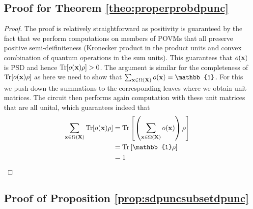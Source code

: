 \subsection{Proof for Theorem \ref{theo:properprobdpunc}}
\label{sec:proof:theo:properpropdpunc}

\theoproperprobdpunc*

\begin{proof}
	The proof is relatively straightforward as positivity is guaranteed by the fact that we perform computations on members of POVMs that all preserve positive semi-deifiniteness (Kronecker product in the product units and convex combination of quantum operations in the sum units). This guarantees that $o(\mathbf{x})$ is PSD and hence $ \Tr [o(\mathbf{x}) \rho]>0$. The argument is similar for the completeness of $\Tr [o(\mathbf{x}) \rho]$ as here we need to show that $\sum_{\xvars \in \Omega(\Xvars)} \ocircuit(\xvars) =\mathbb{1}$. For this we push down the summations to the corresponding leaves where we obtain unit matrices. The circuit then performs again computation with these unit matrices that are all unital, which guarantees indeed that
	\begin{align}
		\sum_{\xvars \in \Omega(\Xvars)} \Tr [\ocircuit(\xvars) \rho]
		 & =
		\Tr \left[
			\left(
			\sum_{\xvars \in \Omega(\Xvars)}\ocircuit(\xvars)
			\right)
			\rho
			\right]
		\\
		 & =
		\Tr \left[  \mathbb{1} \rho\right]
		\nonumber
		\\
		 & =1
		\nonumber
	\end{align}
\end{proof}



\subsection{Proof of Proposition \ref{prop:sdpuncsubsetdpunc}}
\label{sec:proof:prop:sdpuncsubsetdpunc}

\propsdpuncsubsetdpunc*


